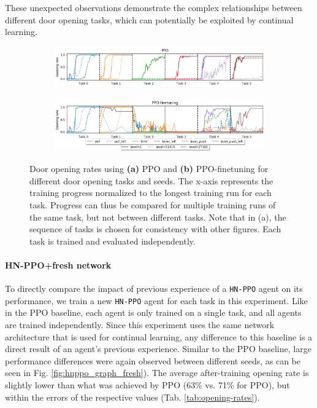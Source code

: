 \documentclass[dvipsnames]{article} %
\newcommand{\comment}[1]{}
\newcommand{\jh}[1] {\comment{{\color{RawSienna} JH: #1}}}           %
\begin{document}
These unexpected observations demonstrate the complex relationships between different door opening tasks, which can potentially be exploited by continual learning. 

\begin{figure}[htbp]
\begin{subfigure}{\linewidth}
    \includegraphics[width=1.0\linewidth]{images/cl_timeseries_series7_config.png}
    \caption{}
    \label{fig:ppo-baseline-graph}
\end{subfigure}
\begin{subfigure}{\linewidth}
    \includegraphics[width=1.0\linewidth]{images/cl_timeseries_series8_config.png}
    \caption{}
    \label{fig:ppo-finetuning-graph}
\end{subfigure}
\caption{Door opening rates using \textbf{(a)} PPO and \textbf{(b)} PPO-finetuning for different door opening tasks and seeds. The x-axis represents the training progress normalized to the longest training run for each task. Progress can thus be compared for multiple training runs of the same task, but not between different tasks. Note that in (a), the sequence of tasks is chosen for consistency with other figures. Each task is trained and evaluated independently.\jh{Instead of plotting all three seeds, how about plotting the median value and a shaded area?}}
\end{figure}

\paragraph{HN-PPO+fresh network} To directly compare the impact of previous experience of a \texttt{HN-PPO} agent on its performance, we train a new \texttt{HN-PPO} agent for each task in this experiment. Like in the PPO baseline, each agent is only trained on a single task, and all agents are trained independently. Since this experiment uses the same network architecture that is used for continual learning, any difference to this baseline is a direct result of an agent's previous experience. Similar to the PPO baseline, large performance differences were again observed between different seeds, as can be seen in Fig. \ref{fig:hnppo_graph_fresh}). The average after-training opening rate is slightly lower than what was achieved by PPO (63\% vs. 71\% for PPO), but within the errors of the respective values (Tab. \ref{tab:opening-rates}).
\end{document}
